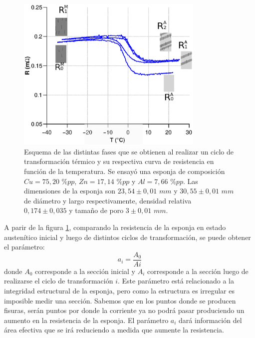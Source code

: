 \documentclass[a4paper,12pt,fleqn,twoside,openany]{book}
\begin{document}
 \begin{figure}
 \centering
 \includegraphics[width=0.8\textwidth]{Img/Resultados/Resistencia/Histeresis2.eps}
 \caption{Esquema de las distintas fases que se obtienen al realizar un ciclo de transformación térmico y su respectiva curva de resistencia en función de la temperatura. Se ensayó una esponja de composición $Cu=75,20$ $\%pp$, $Zn=17,14$ $\%pp$ y $Al=7,66$ $\%pp$. Las dimensiones de la esponja son $23,54 \pm0,01$ $mm$ y $30,55 \pm0,01$ $mm$ de diámetro y largo respectivamente, densidad relativa $0,174 \pm 0,035$ y tamaño de poro $3 \pm 0,01$ $mm$.
 } 
 \label{fig:HistEsquema}
 \end{figure}

 A parir de la figura \ref{fig:HistEsquema}, comparando la resistencia de la esponja en estado austenítico inicial y luego de distintos ciclos de transformación, se puede obtener el parámetro:
 \begin{equation}
  a_i = \frac{A_0}{Ai}
 \end{equation}
donde $A_0$ corresponde a la sección inicial y $A_i$ corresponde a la sección luego de realizarse el ciclo de transformación $i$. Este parámetro está relacionado a la integridad estructural de la esponja, pero como la estructura es irregular es imposible medir una sección. Sabemos que en los puntos donde se producen fisuras, serán puntos por donde la corriente ya no podrá pasar produciendo un aumento en la resistencia de la esponja. El parámetro $a_i$ dará información del área efectiva que se irá reduciendo a medida que aumente la resistencia. 
\end{document}
